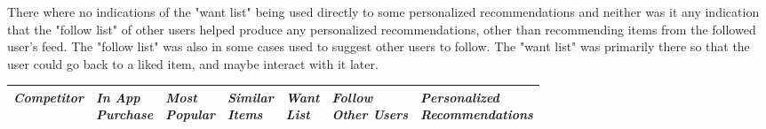     There where no indications of the "want list" being used directly to some personalized recommendations and neither was it any indication that the "follow list" of other users helped produce any personalized recommendations, other than recommending items from the followed user's feed.
    The "follow list" was also in some cases used to suggest other users to follow.
    The "want list" was primarily there so that the user could go back to a liked item, and maybe interact with it later.
    \begin{table}[H]
        \centering
        \begin{tabular}{l l l l l l l}
            \toprule
            \emph{Competitor} &
            \pbox{5cm}{\emph{In App} \\ \emph{Purchase}} &
            \pbox{5cm}{\emph{Most} \\ \emph{Popular}} &
            \pbox{5cm}{\emph{Similar} \\ \emph{Items}} &
            \pbox{5cm}{\emph{Want} \\ \emph{List}} &
            \pbox{5cm}{\emph{Follow} \\ \emph{Other Users}} &
            \pbox{5cm}{\emph{Personalized} \\ \emph{Recommendations}} \\ \hline


\end{tabular}
\end{table}
